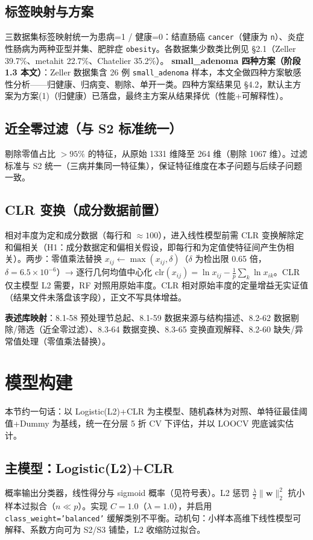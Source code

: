 \documentclass{internal-report}
\begin{document}
\subsection{标签映射与方案}
三数据集标签映射统一为患病=1 / 健康=0：结直肠癌 \texttt{cancer}（健康为 \texttt{n}）、炎症性肠病为两种亚型并集、肥胖症 \texttt{obesity}。各数据集少数类比例见 §2.1（Zeller 39.7\%、metahit 22.7\%、Chatelier 35.2\%）。
\textbf{small\_adenoma 四种方案（阶段 1.3 本文）}：Zeller 数据集含 26 例 \texttt{small\_adenoma} 样本，本文全做四种方案敏感性分析——归健康、归病变、剔除、单开一类。四种方案结果见 §4.2，默认主方案为方案(1)（归健康）已落盘，最终主方案从结果择优（性能+可解释性）。

\subsection{近全零过滤（与 S2 标准统一）}
剔除零值占比 $>95\%$ 的特征，从原始 1331 维降至 264 维（剔除 1067 维）。过滤标准与 S2 统一（三病并集同一特征集），保证特征维度在本子问题与后续子问题一致。

\subsection{CLR 变换（成分数据前置）}
相对丰度为定和成分数据（每行和 $\approx 100$），进入线性模型前需 CLR 变换解除定和偏相关（H1：成分数据定和偏相关假设，即每行和为定值使特征间产生伪相关）。两步：零值乘法替换 $x_{ij}\leftarrow\max(x_{ij},\delta)$（$\delta$ 为检出限 0.65 倍，$\delta=6.5\times10^{-6}$）→ 逐行几何均值中心化 $\mathrm{clr}(x_{ij})=\ln x_{ij}-\frac{1}{p}\sum_{k}\ln x_{ik}$。CLR 仅主模型 L2 需要，RF 对照用原始丰度。CLR 相对原始丰度的定量增益无实证值（结果文件未落盘该字段），正文不写具体增益。

\textbf{表述库映射}：8.1-58 预处理节总起、8.1-59 数据来源与结构描述、8.2-62 数据剔除/筛选（近全零过滤）、8.3-64 数据变换、8.3-65 变换直观解释、8.2-60 缺失/异常值处理（零值乘法替换）。

\section{模型构建}
\label{sec:model}

本节约一句话：以 Logistic(L2)+CLR 为主模型、随机森林为对照、单特征最佳阈值+Dummy 为基线，统一在分层 5 折 CV 下评估，并以 LOOCV 兜底诚实估计。

\subsection{主模型：Logistic(L2)+CLR}
概率输出分类器，线性得分与 sigmoid 概率（见符号表）。L2 惩罚 $\frac{\lambda}{2}\lVert\mathbf{w}\rVert_2^2$ 抗小样本过拟合（$n\ll p$）。实现 $C=1.0$（$\lambda=1.0$），并启用 \texttt{class\_weight='balanced'} 缓解类别不平衡。动机句：小样本高维下线性模型可解释、系数方向可为 S2/S3 铺垫，L2 收缩防过拟合。
\end{document}
